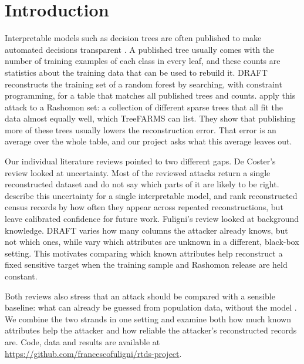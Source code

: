 \section{Introduction}

Interpretable models such as decision trees are often published to make automated
decisions transparent \citep{rudin2019stop}. A published tree usually comes with the number
of training examples of each class in every leaf, and these counts are statistics about the
training data that can be used to rebuild it. DRAFT \citep{ferry2024draft} reconstructs the
training set of a random forest by searching, with constraint programming, for a table that
matches all published trees and counts. \citet{hsu2026rashomon} apply this attack to a
Rashomon set: a collection of different sparse trees that all fit the data almost equally
well, which TreeFARMS \citep{xin2022treefarms} can list. They show that publishing more of
these trees usually lowers the reconstruction error. That error is an average over the whole
table, and our project asks what this average leaves out.

Our individual literature reviews pointed to two different gaps. De Coster's review looked
at uncertainty. Most of the reviewed attacks return a single reconstructed dataset and do not
say which parts of it are likely to be right. \citet{ferry2024probabilistic} describe this
uncertainty for a single interpretable model, and \citet{dick2023confidence} rank
reconstructed census records by how often they appear across repeated reconstructions, but
leave calibrated confidence for future work. Fuligni's review looked at background
knowledge. DRAFT varies how many columns the attacker already knows, but not which ones,
while \citet{mehnaz2022sensitive} vary which attributes are unknown in a different,
black-box setting. This motivates comparing which known attributes help reconstruct a
fixed sensitive target when the training sample and Rashomon release are held constant.

Both reviews also stress that an attack should be compared with a sensible baseline: what
can already be guessed from population data, without the model
\citep{abowd2025census,jayaraman2022imputation}. We combine the two strands in one setting
and examine both how much known attributes help the attacker and how reliable the
attacker's reconstructed records are. Code, data and results are available at
\url{https://github.com/francescofuligni/rtds-project}.

